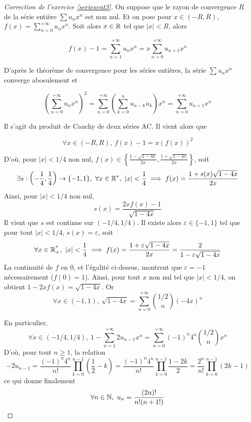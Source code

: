 \begin{proof}[Correction de l'exercice \ref{seriesent3}]
On suppose que le rayon de convergence $R$ de la série entière $\sum u_nx^n$ est non nul.
Et on pose pour $x\in(-R,R)$, $f(x)=\sum_{n=0}^{+\infty}u_nx^n$. 
Soit alors $x\in\operatorname{\mathbb R}$ tel que $|x|<R$, alors 

\[f(x)-1=\sum_{n=1}^{+\infty}u_nx^n=x\sum_{n=0}^{+\infty}u_{n+1}x^n\]

D'après le théorème de convergence pour les séries entières, la série $\sum u_nx^n$ converge abosulement et 

\[\left(\sum_{n=0}^{+\infty}u_nx^n\right)^2=\sum_{n=0}^{+\infty}\left(\sum_{k=0}^nu_{n-k}u_k\right)x^n=\sum_{n=0}^{+\infty}u_{n+1}x^n\]

Il s'agit du produit de Cauchy de deux séries AC.
Il vient alors que

\[\forall x\in(-R,R),\ f(x)-1=x(f(x))^2\]

D'où, pour $|x|<1/4$ non nul, $f(x)\in\left\lbrace \frac{1-\sqrt{1-4x}}{2x},\frac{1+\sqrt{1-4x}}{2x}\right\rbrace$, soit 
\[\exists s:\left(-\frac14,\frac14\right)\to\lbrace-1,1\rbrace,\ \forall x\in\operatorname{\mathbb R}^*,\ |x|<\frac14\implies f(x)=\frac{1+s(x)\sqrt{1-4x}}{2x}\]
Ainsi, pour $|x|<1/4$ non nul, \[s(x)=\frac{2xf(x)-1}{\sqrt{1-4x}}\]
Il vient que $s$ est continue sur $\left(-1/4,1/4\right)$.
Il existe alors $\varepsilon\in\lbrace -1,1\rbrace$ tel que pour tout $|x|<1/4$, $s(x)=\varepsilon$, soit 
\[
    \forall x\in\Rpe,\ |x|<\frac14\implies f(x)=\frac{1+\varepsilon\sqrt{1-4x}}{2x}=\frac2{1-\varepsilon\sqrt{1-4x}}  
\]
La continuité de $f$ en $0$, et l'égalité ci-dessus, montrent que $\varepsilon=-1$ nécessairement ($f(0)=1$). 
Ainsi, pour tout $x$ non nul tel que $|x|<1/4$, on obtient $1-2xf(x)=\sqrt{1-4x}$. 
Or
\[
\forall x\in(-1,1),\ \sqrt{1-4x}=\sum_{n=0}^{+\infty}\binom{1/2}n(-4x)^n
\]

En particulier,
\[
    \forall x\in(-1/4,1/4),\ 1-\sum_{n=1}^{+\infty}2u_{n-1}x^n=\sum_{n=0}^{+\infty}(-1)^n4^n\binom{1/2}nx^n
\]
D'où, pour tout $n\geq 1$, la relation 
\[
    -2u_{n-1}=\frac{(-1)^n4^n}{n!}\prod_{k=0}^{n-1}\left(\frac12-k\right)=\frac{(-1)^n4^n}{n!}\prod_{k=0}^{n-1}\frac{1-2k}2=\frac{2^n}{n!}\prod_{k=0}^{n-1}(2k-1)    
\]
ce qui donne finalement 
\[
    \forall n\in\N,\ u_n=\frac{(2n)!}{n!(n+1!)}
\]
\end{proof}

